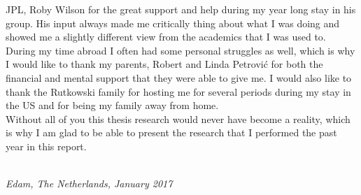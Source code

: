 \ac{JPL}, Roby Wilson for the great support and help during my year long stay in his group. His input always made me critically thing about what I was doing and showed me a slightly different view from the academics that I was used to. \\
During my time abroad I often had some personal struggles as well, which is why I would like to thank my parents, Robert and Linda Petrovi\'{c} for both the financial and mental support that they were able to give me. I would also like to thank the Rutkowski family for hosting me for several periods during my stay in the US and for being my family away from home. \\
Without all of you this thesis research would never have become a reality, which is why I am glad to be able to present the research that I performed the past year in this report. 


\begin{flushright}
{\makeatletter\itshape
    \@author \\
    Edam, The Netherlands, January 2017
\makeatother}
\end{flushright}

